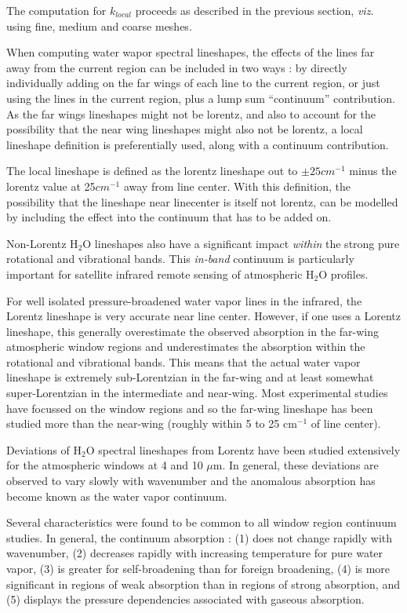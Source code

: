 \documentclass[11pt]{article}
\begin{document}
The computation for $k_{local}$ proceeds as described in the previous 
section, {\em viz.} using fine, medium and coarse meshes.

When computing water wapor spectral lineshapes, the effects of the lines
far away from the current region can be included in two ways : by directly 
individually adding on the far wings of each line to the current region, or
just using the lines in the current region, plus a lump sum ``continuum'' 
contribution. As the far wings lineshapes might not be lorentz, and also to 
account for the possibility that the near wing lineshapes might also not
be lorentz, a local lineshape definition is preferentially used, along with 
a continuum contribution. 

The local lineshape is defined as the lorentz lineshape out to 
$\pm 25 cm^{-1}$
minus the lorentz value at 25$cm^{-1}$ away from line center. With this 
definition, the possibility that the lineshape near linecenter is itself not
lorentz, can be modelled by including the effect into the continuum that has
to be added on.

Non-Lorentz H$_2$O lineshapes also have a
significant impact {\it within} the strong pure rotational and vibrational
bands.  This {\it in-band} continuum is
particularly important for satellite infrared remote sensing of atmospheric
H$_2$O profiles.  

For well isolated pressure-broadened water vapor lines in the infrared, the
Lorentz lineshape is very accurate near line center.  However, if one uses
a Lorentz lineshape, this generally overestimate the observed 
absorption in the far-wing atmospheric window regions and underestimates the
absorption within the rotational and vibrational bands. This means that 
the actual water vapor lineshape is extremely sub-Lorentzian in the 
far-wing and at least somewhat super-Lorentzian in the intermediate
and near-wing.  Most experimental studies have focussed on the window 
regions and so the far-wing lineshape has been studied more than 
the near-wing (roughly within 5 to 25 cm$^{-1}$ of line center).

Deviations of H$_2$O spectral lineshapes from Lorentz have been studied
extensively for the atmospheric windows at 4 and 10 $\mu$m.  In general,
these deviations are observed to vary slowly with wavenumber and the 
anomalous absorption has become known as the water vapor continuum.  

Several characteristics were found to be common to all window region 
continuum studies.  In general, the continuum absorption 
\cite[for example]{bur:81,gra:90}: (1) does not change rapidly
with wavenumber, (2) decreases rapidly with increasing temperature for
pure water vapor, (3) is greater for self-broadening than for foreign
broadening, (4) is more significant in regions of weak absorption
than in regions of strong absorption, and (5) displays the pressure
dependencies associated with gaseous absorption.
\end{document}
